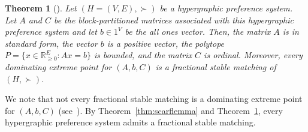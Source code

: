 \documentclass[11pt]{article}
\newcommand{\R}{\mathbb{R}}
\newtheorem{theorem}{Theorem}
\begin{document}
\begin{theorem}[\cite{aharoni2003lemma}]\label{thm:Domin-SM}
Let $(H=(V,E),\succ)$ be a hypergraphic preference system. 
Let $A$ and $C$ be the block-partitioned matrices associated with this hypergraphic preference system and let $b\in {1}^V$ be the all ones vector. Then, the matrix $A$ is in standard form, the vector $b$ is a positive vector, the polytope $P=\{x\in \R^E_{\ge 0}: Ax=b\}$ is bounded, and the matrix $C$ is ordinal. Moreover, every dominating extreme point for $(A,b,C)$ is a fractional stable matching of $(H,\succ)$.

\end{theorem}

We note that not every fractional stable matching is a dominating extreme point for $(A,b,C)$ (see~\cite{faenza2023scarf}). By Theorem~\ref{thm:scarflemma} and Theorem~\ref{thm:Domin-SM}, every hypergraphic preference system admits a fractional stable matching.
\end{document}
